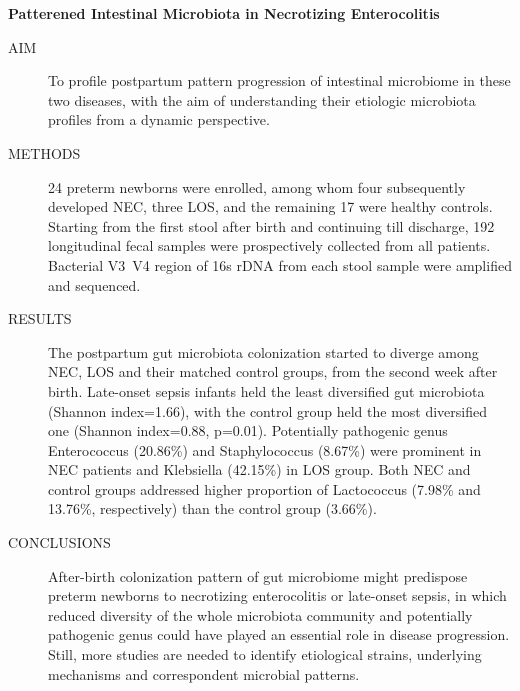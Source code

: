 \begin{englishabstract}
  \textbf{Patterened Intestinal Microbiota in Necrotizing Enterocolitis}
    \begin{description}
      \item[AIM] To profile postpartum pattern progression of intestinal microbiome in these two diseases, with the aim of understanding their etiologic microbiota profiles from a dynamic perspective.
      \item[METHODS] 24 preterm newborns were enrolled, among whom four subsequently developed NEC, three LOS, and the remaining 17 were healthy controls. Starting from the first stool after birth and continuing till discharge, 192 longitudinal fecal samples were prospectively collected from all patients. Bacterial V3~V4 region of 16s rDNA from each stool sample were amplified and sequenced.
      \item[RESULTS] The postpartum gut microbiota colonization started to diverge among NEC, LOS and their matched control groups, from the second week after birth.  Late-onset sepsis infants held the least diversified gut microbiota (Shannon index=1.66), with the control group held the most diversified one (Shannon index=0.88, p=0.01). Potentially pathogenic genus Enterococcus (20.86\%) and Staphylococcus (8.67\%) were prominent in NEC patients and Klebsiella (42.15\%) in LOS group. Both NEC and control groups addressed higher proportion of Lactococcus (7.98\% and 13.76\%, respectively) than the control group (3.66\%).
      \item[CONCLUSIONS] After-birth colonization pattern of gut microbiome might predispose preterm newborns to necrotizing enterocolitis or late-onset sepsis, in which reduced diversity of the whole microbiota community and potentially pathogenic genus could have played an essential role in disease progression. Still, more studies are needed to identify etiological strains, underlying mechanisms and correspondent microbial patterns.
    \end{description}



\end{englishabstract}
